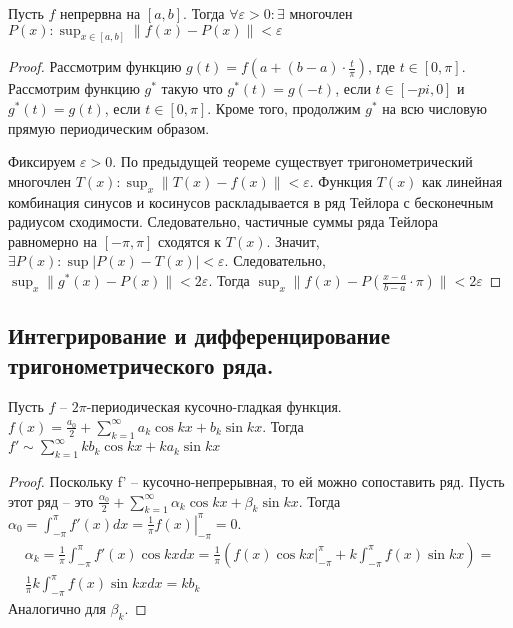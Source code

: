 \documentclass[document.tex]{subfiles}
\begin{document}
\begin{theorem}[Вейрштрасса]
    Пусть $f$ непрервна на $[a, b]$. Тогда $\forall \varepsilon > 0: \exists$ многочлен $P(x): \sup_{x \in [a, b]}
    \|f(x) - P(x)\| < \varepsilon$
\end{theorem}

\begin{proof}
    Рассмотрим функцию $g(t) = f(a + (b - a) \cdot \frac{t}{\pi})$, где $t \in [0, \pi]$. Рассмотрим функцию $g^*$ такую
    что $g^*(t) = g(-t)$, если $t \in [-pi, 0]$ и $g^*(t) = g(t)$, если $t \in [0, \pi]$. Кроме того, продолжим $g^*$ на
    всю числовую прямую периодическим образом.

    Фиксируем $\varepsilon > 0$. По предыдущей теореме существует тригонометрический многочлен $T(x):
    \sup_x \|T(x) - f(x)\| < \varepsilon$. Функция $T(x)$ как линейная комбинация синусов и косинусов раскладывается в
    ряд Тейлора с бесконечным радиусом сходимости. Следовательно, частичные суммы ряда Тейлора равномерно на $[-\pi,
    \pi]$ сходятся к $T(x)$. Значит, $\exists P(x): \sup |P(x) - T(x)| < \varepsilon$.
    Следовательно, $\sup_x \|g^*(x) - P(x)\| < 2 \varepsilon$. Тогда $\sup_x \|f(x) - P(\frac{x - a}{b - a} \cdot
    \pi)\| < 2 \varepsilon$

\end{proof}

\subsection{Интегрирование и дифференцирование тригонометрического ряда.}

\begin{theorem}
    Пусть $f$ -- $2 \pi$-периодическая кусочно-гладкая функция. $f(x) = \frac{a_0}{2} + \sum_{k = 1}^{\infty} a_k \cos
    kx + b_k \sin kx$. Тогда $f' \sim  \sum_{k = 1}^{\infty} kb_k \cos kx + ka_k \sin kx$
\end{theorem}

\begin{proof}
    Поскольку f' -- кусочно-непрерывная, то ей можно сопоставить ряд. Пусть этот ряд -- это $\frac{\alpha_0}{2} +
    \sum_{k = 1}^{\infty} \alpha_k \cos kx + \beta_k \sin kx$. Тогда $\alpha_0 = \int_{-\pi}^{\pi}f'(x)dx = \left.
    \frac{1}{\pi}f(x) \right|_{-\pi}^{\pi} = 0$.
    \begin{multline*}
        \alpha_k = \frac{1}{\pi} \int_{-\pi}^{\pi}f'(x) \cos kx dx = \frac{1}{\pi} (f(x) \cos kx \left.
        \right|_{-\pi}^{\pi} + k \int_{-\pi}^{\pi}f(x) \sin kx) = \\
        \frac{1}{\pi} k \int_{-\pi}^{\pi}f(x) \sin kx dx = k
        b_k
    \end{multline*}
    Аналогично для $\beta_k$.
\end{proof}
\end{document}
